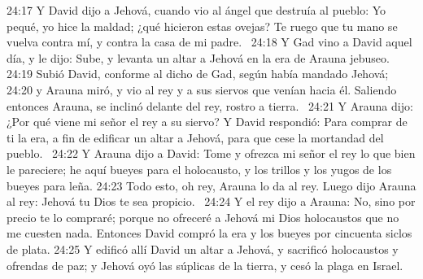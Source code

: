24:17 Y David dijo a Jehová, cuando vio al ángel que destruía al pueblo: Yo pequé, yo hice la maldad; ¿qué hicieron estas ovejas? Te ruego que tu mano se vuelva contra mí, y contra la casa de mi padre.  
24:18 Y Gad vino a David aquel día, y le dijo: Sube, y levanta un altar a Jehová en la era de Arauna jebuseo.  
24:19 Subió David, conforme al dicho de Gad, según había mandado Jehová;  
24:20 y Arauna miró, y vio al rey y a sus siervos que venían hacia él. Saliendo entonces Arauna, se inclinó delante del rey, rostro a tierra.  
24:21 Y Arauna dijo: ¿Por qué viene mi señor el rey a su siervo? Y David respondió: Para comprar de ti la era, a fin de edificar un altar a Jehová, para que cese la mortandad del pueblo.  
24:22 Y Arauna dijo a David: Tome y ofrezca mi señor el rey lo que bien le pareciere; he aquí bueyes para el holocausto, y los trillos y los yugos de los bueyes para leña. 
24:23 Todo esto, oh rey, Arauna lo da al rey. Luego dijo Arauna al rey: Jehová tu Dios te sea propicio.  
24:24 Y el rey dijo a Arauna: No, sino por precio te lo compraré; porque no ofreceré a Jehová mi Dios holocaustos que no me cuesten nada. Entonces David compró la era y los bueyes por cincuenta siclos de plata. 
24:25 Y edificó allí David un altar a Jehová, y sacrificó holocaustos y ofrendas de paz; y Jehová oyó las súplicas de la tierra, y cesó la plaga en Israel.  
